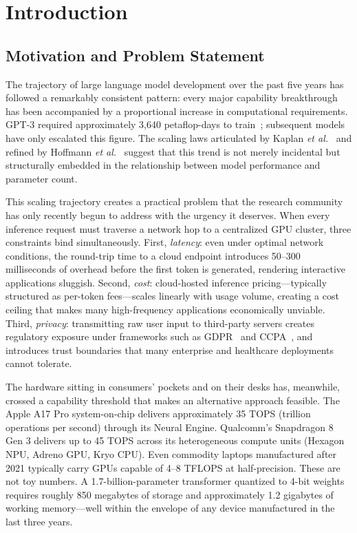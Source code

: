 \documentclass[12pt, letterpaper, twoside]{report}
\newcommand{\etal}{\textit{et al.}\xspace}
\begin{document}
\clearpage

\chapter{Introduction}
\label{ch:introduction}

\section{Motivation and Problem Statement}
\label{sec:motivation}

The trajectory of large language model development over the past five years has followed a remarkably consistent pattern: every major capability breakthrough has been accompanied by a proportional increase in computational requirements. GPT-3 required approximately 3,640 petaflop-days to train~\cite{brown2020language}; subsequent models have only escalated this figure. The scaling laws articulated by Kaplan \etal~\cite{kaplan2020scaling} and refined by Hoffmann \etal~\cite{hoffmann2022training} suggest that this trend is not merely incidental but structurally embedded in the relationship between model performance and parameter count.

This scaling trajectory creates a practical problem that the research community has only recently begun to address with the urgency it deserves. When every inference request must traverse a network hop to a centralized GPU cluster, three constraints bind simultaneously. First, \textit{latency}: even under optimal network conditions, the round-trip time to a cloud endpoint introduces 50--300 milliseconds of overhead before the first token is generated, rendering interactive applications sluggish. Second, \textit{cost}: cloud-hosted inference pricing---typically structured as per-token fees---scales linearly with usage volume, creating a cost ceiling that makes many high-frequency applications economically unviable. Third, \textit{privacy}: transmitting raw user input to third-party servers creates regulatory exposure under frameworks such as GDPR~\cite{gdpr2016} and CCPA~\cite{ccpa2018}, and introduces trust boundaries that many enterprise and healthcare deployments cannot tolerate.

The hardware sitting in consumers' pockets and on their desks has, meanwhile, crossed a capability threshold that makes an alternative approach feasible. The Apple A17 Pro system-on-chip delivers approximately 35 TOPS (trillion operations per second) through its Neural Engine. Qualcomm's Snapdragon 8 Gen 3 delivers up to 45 TOPS across its heterogeneous compute units (Hexagon NPU, Adreno GPU, Kryo CPU). Even commodity laptops manufactured after 2021 typically carry GPUs capable of 4--8 TFLOPS at half-precision. These are not toy numbers. A 1.7-billion-parameter transformer quantized to 4-bit weights requires roughly 850 megabytes of storage and approximately 1.2 gigabytes of working memory---well within the envelope of any device manufactured in the last three years.
\end{document}
